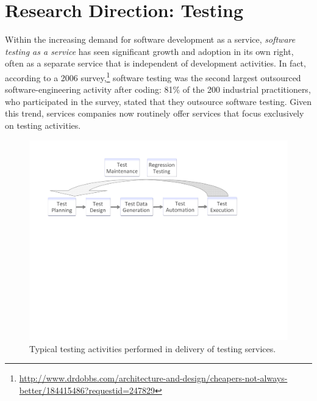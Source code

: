 
\section{Research Direction: Testing}
\label{sec:testing-debugging}

Within the increasing demand for software development as a service,
\textit{software testing as a service} has seen significant growth and adoption
in its own right, often as a separate service that is independent of development
activities. In fact, according to a 2006 survey,\footnote{\scriptsize
  \url{http://www.drdobbs.com/architecture-and-design/cheapers-not-always-better/184415486?requestid=247829}}
software testing was the second largest outsourced software-engineering activity
after coding: 81\% of the 200 industrial practitioners, who participated in the
survey, stated that they outsource software testing. Given this trend, services
companies now routinely offer services that focus exclusively on testing
activities.


\begin{figure}[t]
\centering
\includegraphics[width=\columnwidth, clip, trim = 20mm 133mm 55mm
  18mm]{figs/testing-activities.pdf}
\vspace*{-15pt}
\caption{Typical testing activities performed in delivery of testing services.}
\vspace*{-10pt}
\label{fig:testing-activities}
\end{figure}

